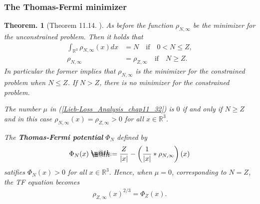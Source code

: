 \documentclass[openany, a4paper, oneside]{book}
\makeatletter
\newcommand*{\defeq}{\mathrel{\rlap{%
\raisebox{0.3ex}{$\m@th\cdot$}}%
\raisebox{-0.3ex}{$\m@th\cdot$}}%
=}
\theoremstyle{break}
\newtheorem{thm}{Theorem.}[section]
\theoremstyle{breakdefn}
\newcommand{\abs}[1]{\left|#1\right|}
\newcommand{\rbk}[1]{\left (#1\right)}
\newcommand{\bbRthree}{\mathbb{R}^3}
\newcommand{\rhoNinfty}{\rho_{N, \infty}}
\newcommand{\upbf}[1]{\textup{\textbf{#1}}}
\makeatother
\begin{document}
\subsubsection{The Thomas-Fermi minimizer \label{Lieb-Loss_Analysis_chap11_39}}
\label{sec-7-10-3-1-4}

\begin{thm}[Theorem 11.14. \cite{LiebLoss1}]
 As before the function $\rhoNinfty$ be the minimizer for the unconstrained problem.
 Then it holds that
 \begin{align}
  \int_{\bbRthree} \rhoNinfty (x) dx
  &=
  N \quad \mathrm{if} \quad 0 < N \leq Z, \\
  \rhoNinfty
  &=
  \rho_{Z, \infty} \quad \mathrm{if} \quad N \geq Z.
 \end{align}
 In particular the former implies that $\rhoNinfty$ is the minimizer for the constrained problem when $N \leq Z$.
 If $N > Z$, there is no minimizer for the constrained problem.

 The number $\mu$ in \textup{(\ref{Lieb-Loss_Analysis_chap11_32})} is $0$ if and only if $N \geq Z$ and in this case
 $\rhoNinfty (x) = \rho_{Z, \infty} > 0$ for all $x \in \bbRthree$.

 The \upbf{Thomas-Fermi potential} $\Phi_N$ defined by
 \begin{align}
  \Phi_N (x)
  \defeq
  \frac{Z}{\abs{x}} - \rbk{\frac{1}{\abs{x}} * \rhoNinfty} (x)
 \end{align}
 satifies $\Phi_N (x) > 0$ for all $x \in \bbRthree$.
 Hence, when $\mu = 0$, corresponding to $N = Z$, the TF equation becomes
 \begin{align}
  \rho_{Z, \infty} (x)^{2/3}
  =
  \Phi_Z (x). \label{Lieb-Loss_Analysis_chap11_35}
 \end{align}
\end{thm}
\end{document}
